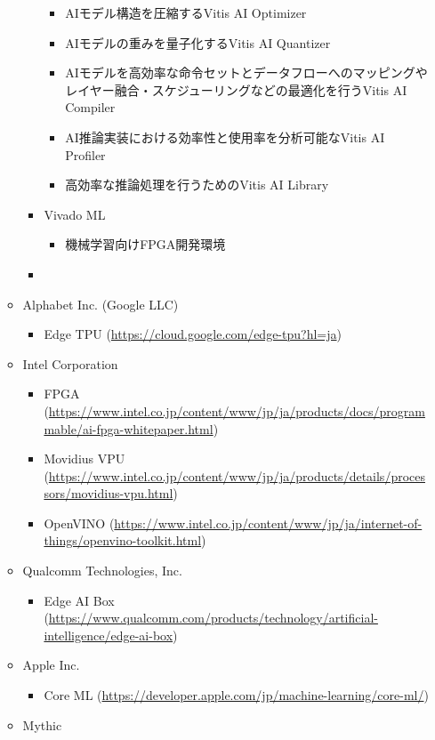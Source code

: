 \begin{itemize}
\begin{itemize}
\begin{itemize}
\begin{itemize}
				\item AIモデル構造を圧縮するVitis AI Optimizer
				\item AIモデルの重みを量子化するVitis AI Quantizer
				\item AIモデルを高効率な命令セットとデータフローへのマッピングやレイヤー融合・スケジューリングなどの最適化を行うVitis AI Compiler
				\item AI推論実装における効率性と使用率を分析可能なVitis AI Profiler
				\item 高効率な推論処理を行うためのVitis AI Library
			\end{itemize}
			\item Vivado ML
			\begin{itemize}
				\item 機械学習向けFPGA開発環境
			\end{itemize}
			\item 
		\end{itemize}
		\item Alphabet Inc. (Google LLC)
		\begin{itemize}
			\item Edge TPU (\url{https://cloud.google.com/edge-tpu?hl=ja})
		\end{itemize}
		\item Intel Corporation
		\begin{itemize}
			\item FPGA (\url{https://www.intel.co.jp/content/www/jp/ja/products/docs/programmable/ai-fpga-whitepaper.html})
			\item Movidius VPU (\url{https://www.intel.co.jp/content/www/jp/ja/products/details/processors/movidius-vpu.html})
			\item OpenVINO (\url{https://www.intel.co.jp/content/www/jp/ja/internet-of-things/openvino-toolkit.html})
		\end{itemize}
		\item Qualcomm Technologies, Inc.
		\begin{itemize}
			\item Edge AI Box (\url{https://www.qualcomm.com/products/technology/artificial-intelligence/edge-ai-box})
		\end{itemize}
		\item Apple Inc.
		\begin{itemize}
			\item Core ML (\url{https://developer.apple.com/jp/machine-learning/core-ml/})
		\end{itemize}
		\item Mythic

\end{itemize}
\end{itemize}
